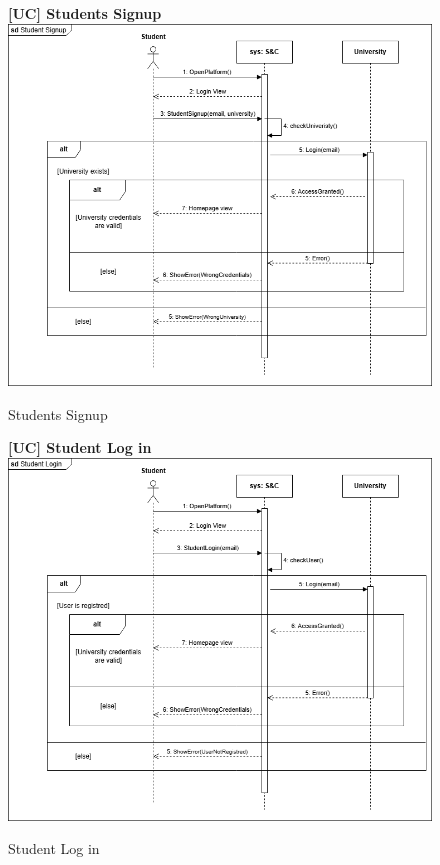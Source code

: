 \begin{figure}[H]
\textbf{[UC\nextUCDiagr] Students Signup}\newline\newline
\includegraphics[width=15cm]{Images/UC_diagram/RASD-UC1.png}
    \caption{Students Signup}
\end{figure}

\begin{figure}[H]
\textbf{[UC\nextUCDiagr] Student Log in}\newline\newline
\includegraphics[width=15cm]{Images/UC_diagram/RASD-UC2.drawio.png}
    \caption{Student Log in}
\end{figure}


